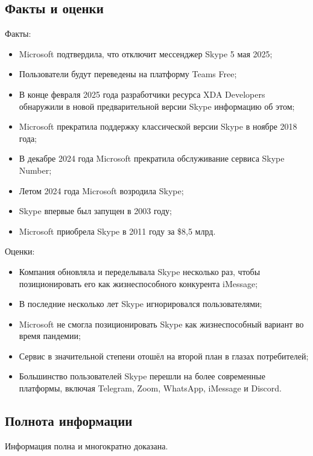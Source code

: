 \documentclass{bsuir}
\begin{document}
\subsection{Факты и оценки}
Факты:

\begin{itemize}
    \item
    Microsoft подтвердила, что отключит мессенджер Skype 5 мая 2025;
    \item
    Пользователи будут переведены на платформу Teams Free;
    \item
    В конце февраля 2025 года разработчики ресурса XDA Developers обнаружили в
    новой предварительной версии Skype информацию об этом;
    \item
    Microsoft прекратила поддержку классической версии Skype в ноябре 2018 года;
    \item
    В декабре 2024 года Microsoft прекратила обслуживание сервиса Skype Number;
    \item
    Летом 2024 года Microsoft возродила Skype;
    \item
    Skype впервые был запущен в 2003 году;
    \item
    Microsoft приобрела Skype в 2011 году за \$8,5 млрд.
\end{itemize}

Оценки:

\begin{itemize}
    \item
    Компания обновляла и переделывала Skype несколько раз, чтобы позиционировать
    его как жизнеспособного конкурента iMessage;
    \item
    В последние несколько лет Skype игнорировался пользователями;
    \item
    Microsoft не смогла позиционировать Skype как жизнеспособный вариант во
    время пандемии;
    \item
    Сервис в значительной степени отошёл на второй план в глазах потребителей;
    \item
    Большинство пользователей Skype перешли на более современные платформы,
    включая Telegram, Zoom, WhatsApp, iMessage и Discord.
\end{itemize}

\subsection{Полнота информации}
Информация полна и многократно доказана.
\end{document}
